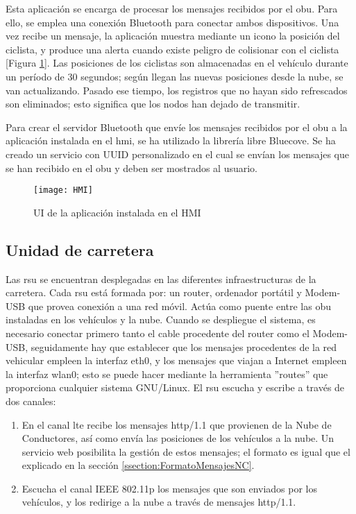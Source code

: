 Esta aplicación se encarga de procesar los mensajes recibidos por el \gls{obu}. Para
ello, se emplea una conexión Bluetooth para conectar ambos dispositivos. Una vez
recibe un mensaje, la aplicación muestra mediante un icono la posición del ciclista,
y produce una alerta cuando existe peligro de colisionar con el ciclista [Figura
\ref{figure:HMI}]. Las posiciones de los ciclistas son almacenadas en el vehículo
durante un período de 30 segundos; según llegan las nuevas posiciones desde la nube,
se van actualizando. Pasado ese tiempo, los registros que no hayan sido refrescados son
eliminados; esto significa que los nodos han dejado de transmitir.

Para crear el servidor Bluetooth que envíe los mensajes recibidos por el \gls{obu} a la
aplicación instalada en el \gls{hmi}, se ha utilizado la librería libre Bluecove. Se ha
creado un servicio con UUID personalizado en el cual se envían los mensajes que se han
recibido en el \gls{obu} y deben ser mostrados al usuario.

\begin{figure}[H]
	\begin{center}
		\texttt{[image: HMI]}
		\caption{UI de la aplicación instalada en el HMI}
		\label{figure:HMI}
	\end{center}
\end{figure}

\subsection{Unidad de carretera}
Las \gls{rsu} se encuentran desplegadas en las diferentes infraestructuras de la
carretera. Cada \gls{rsu} está formada por: un router, ordenador portátil y Modem-USB
que provea conexión a una red móvil. Actúa como puente entre las \gls{obu} instaladas
en los vehículos y la nube. Cuando se despliegue el sistema, es necesario conectar
primero tanto el cable procedente del router como el Modem-USB, seguidamente hay que
establecer que los mensajes procedentes de la red vehicular empleen la interfaz eth0,
y los mensajes que viajan a Internet empleen la interfaz wlan0; esto se puede hacer
mediante la herramienta ''routes'' que proporciona cualquier sistema GNU/Linux. El \gls{rsu}
escucha y escribe a través de dos canales:
\begin{enumerate}
	\item En el canal \gls{lte} recibe los mensajes \Gls{http/1.1} que provienen de la
	Nube de Conductores, así como envía las posiciones de los vehículos a la nube. Un
	servicio web posibilita la gestión de estos mensajes; el formato es igual que el
	explicado en la sección \ref{ssection:FormatoMensajesNC}.

	\item Escucha el canal IEEE 802.11p los mensajes que son enviados por los vehículos,
	y los redirige a la nube a través de mensajes \Gls{http/1.1}.
\end{enumerate}

